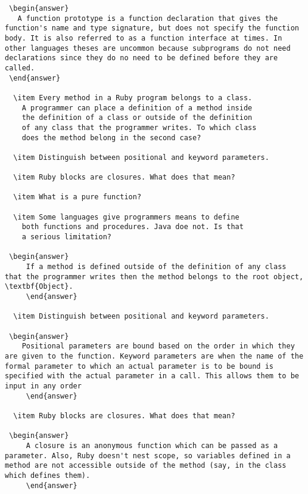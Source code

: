 \begin{enumerate}
\begin{answer}
\begin{lstlisting}
 \begin{answer}
   A function prototype is a function declaration that gives the function's name and type signature, but does not specify the function body. It is also referred to as a function interface at times. In other languages theses are uncommon because subprograms do not need declarations since they do no need to be defined before they are called.
 \end{answer}

  \item Every method in a Ruby program belongs to a class.
    A programmer can place a definition of a method inside
    the definition of a class or outside of the definition
    of any class that the programmer writes. To which class
    does the method belong in the second case?

  \item Distinguish between positional and keyword parameters.

  \item Ruby blocks are closures. What does that mean?

  \item What is a pure function?

  \item Some languages give programmers means to define
    both functions and procedures. Java doe not. Is that
    a serious limitation?

 \begin{answer}
     If a method is defined outside of the definition of any class that the programmer writes then the method belongs to the root object, \textbf{Object}.
     \end{answer}

  \item Distinguish between positional and keyword parameters.

 \begin{answer}
    Positional parameters are bound based on the order in which they are given to the function. Keyword parameters are when the name of the formal parameter to which an actual parameter is to be bound is specified with the actual parameter in a call. This allows them to be input in any order
     \end{answer}

  \item Ruby blocks are closures. What does that mean?

 \begin{answer}
     A closure is an anonymous function which can be passed as a parameter. Also, Ruby doesn't nest scope, so variables defined in a method are not accessible outside of the method (say, in the class which defines them).
     \end{answer}
   


\end{lstlisting}
\end{answer}
\end{enumerate}
